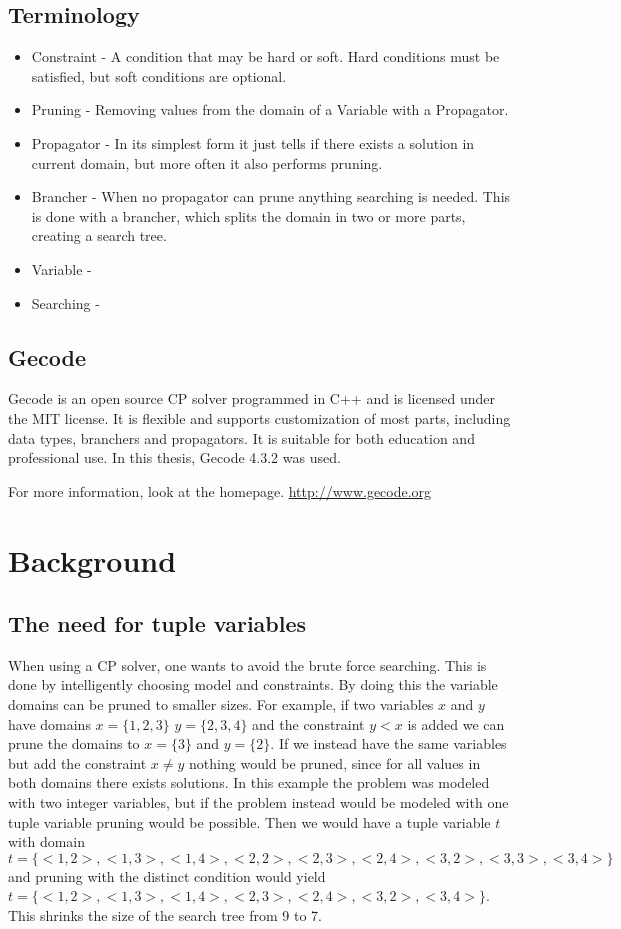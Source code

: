 \documentclass[a4paper,11pt]{article}
\begin{document}
\subsection{Terminology}
\begin{itemize}
\item{Constraint - A condition that may be hard or soft. Hard conditions must be satisfied, but soft conditions are optional.}
\item{Pruning} - Removing values from the domain of a Variable with a Propagator.
\item{Propagator} - In its simplest form it just tells if there exists a solution in current domain, but more often it also performs pruning.
\item{Brancher} - When no propagator can prune anything searching is needed. This is done with a brancher, which splits the domain in two or more parts, creating a search tree.
\item{Variable} -
\item{Searching} - 
\end{itemize}

\subsection{Gecode}
Gecode is an open source CP solver programmed in C++ and is licensed under the MIT license. It is flexible and supports customization of most parts, including data types, branchers and propagators. It is suitable for both education and professional use. In this thesis, Gecode 4.3.2 was used.

For more information, look at the homepage. \url{http://www.gecode.org}

\section{Background}
\subsection{The need for tuple variables}
When using a CP solver, one wants to avoid the brute force searching. This is done by intelligently choosing model and constraints. By doing this the variable domains can be pruned to smaller sizes. For example, if two variables $x$ and $y$ have domains $x=\{1,2,3\}$ $y=\{2,3,4\}$ and the constraint $y<x$ is added we can prune the domains to $x=\{3\}$ and $y=\{2\}$. If we instead have the same variables but add the constraint $x\neq y$ nothing would be pruned, since for all values in both domains there exists solutions. In this example the problem was modeled with two integer variables, but if the problem instead would be modeled with one tuple variable pruning would be possible. Then we would have a tuple variable $t$ with domain $t=\{<1,2>,<1,3>,<1,4>,<2,2>,<2,3>,<2,4>,<3,2>,<3,3>,<3,4>\}$ and pruning with the distinct condition would yield $t=\{<1,2>,<1,3>,<1,4>,<2,3>,<2,4>,<3,2>,<3,4>\}$. This shrinks the size of the search tree from 9 to 7. 
\end{document}
